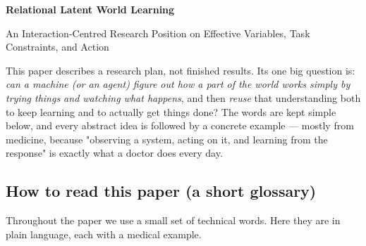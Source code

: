 \documentclass[11pt]{article}
\newenvironment{plainword}{%
  \par\medskip\noindent\begin{minipage}{\textwidth}%
  \color{gray!75!black}\small\itshape
}{%
  \end{minipage}\par\medskip}
\begin{document}
\begin{center}
{\LARGE\bfseries Relational Latent World Learning\par}
\end{center}

\begin{center}
{\large An Interaction-Centred Research Position on Effective Variables, Task Constraints, and Action\par}
\end{center}

\vspace{0.6em}
\begin{plainword}
This paper describes a research plan, not finished results. Its one big question is:
\emph{can a machine (or an agent) figure out how a part of the world works simply by trying things and watching what happens},
and then \emph{reuse} that understanding both to keep learning and to actually get things done? The words are kept
simple below, and every abstract idea is followed by a concrete example --- mostly from medicine, because
"observing a system, acting on it, and learning from the response" is exactly what a doctor does every day.
\end{plainword}

\subsection*{How to read this paper (a short glossary)}

Throughout the paper we use a small set of technical words. Here they are in plain language, each with a medical example.
\end{document}
